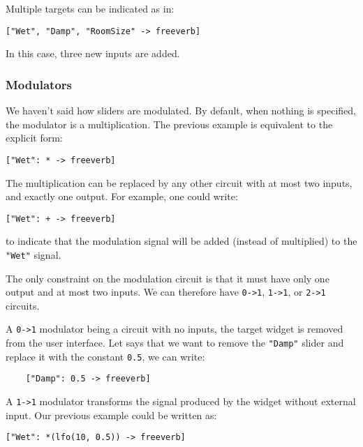 Multiple targets can be indicated as in: 

\begin{lstlisting}
["Wet", "Damp", "RoomSize" -> freeverb]
\end{lstlisting}

In this case, three new inputs are added. 

\subsubsection{Modulators}

We haven't said how sliders are modulated. By default, when nothing is specified, the modulator is a multiplication. The previous example is equivalent to the explicit form:

\begin{lstlisting}
["Wet": * -> freeverb]
\end{lstlisting}

The multiplication can be replaced by any other circuit with at most two inputs, and exactly one output. For example, one could write:

\begin{lstlisting}
["Wet": + -> freeverb]
\end{lstlisting}

to indicate that the modulation signal will be added (instead of multiplied) to the \lstinline`"Wet"` signal.

The only constraint on the modulation circuit is that it must have only one output and at most two inputs. We can therefore have \lstinline`0->1`, \lstinline`1->1`, or \lstinline`2->1` circuits. 

A \lstinline`0->1` modulator being a circuit with no inputs, the target widget is removed from the user interface. Let says that we want to remove the \lstinline`"Damp"` slider and replace it with the constant \lstinline`0.5`, we can write:

\begin{lstlisting}
	["Damp": 0.5 -> freeverb]
\end{lstlisting}
	
A \lstinline`1->1` modulator transforms the signal produced by the widget without external input. Our previous example could be written as:

\begin{lstlisting}
["Wet": *(lfo(10, 0.5)) -> freeverb]
\end{lstlisting}


